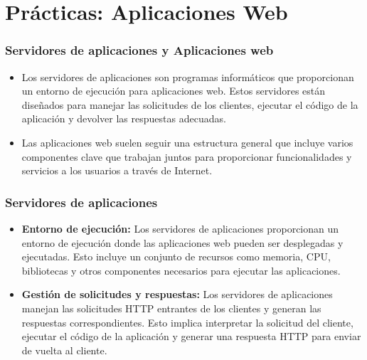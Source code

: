 %


\section{Prácticas: Aplicaciones Web}


\begin{frame}
	\frametitle{Servidores de aplicaciones y Aplicaciones web}	
	\begin{itemize}		
		\item Los servidores de aplicaciones son programas informáticos que proporcionan un entorno de ejecución para aplicaciones web. Estos servidores están diseñados para manejar las solicitudes de los clientes, ejecutar el código de la aplicación y devolver las respuestas adecuadas.
		\item Las aplicaciones web suelen seguir una estructura general que incluye varios componentes clave que trabajan juntos para proporcionar funcionalidades y servicios a los usuarios a través de Internet. 		
	\end{itemize}
\end{frame}


\begin{frame}
	\frametitle{Servidores de aplicaciones}
	
	\begin{itemize}
		\item \textbf{Entorno de ejecución:} Los servidores de aplicaciones proporcionan un entorno de ejecución donde las aplicaciones web pueden ser desplegadas y ejecutadas. Esto incluye un conjunto de recursos como memoria, CPU, bibliotecas y otros componentes necesarios para ejecutar las aplicaciones.				
		\item \textbf{Gestión de solicitudes y respuestas:} Los servidores de aplicaciones manejan las solicitudes HTTP entrantes de los clientes y generan las respuestas correspondientes. Esto implica interpretar la solicitud del cliente, ejecutar el código de la aplicación y generar una respuesta HTTP para enviar de vuelta al cliente.
		
	\end{itemize}	
\end{frame}

